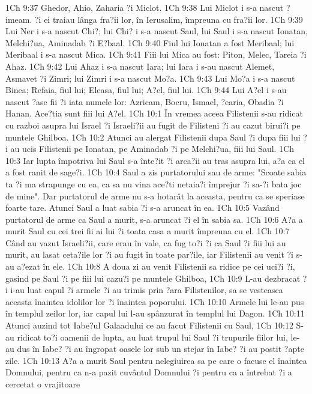 1Ch 9:37  Ghedor, Ahio, Zaharia ?i Miclot.
1Ch 9:38  Lui Miclot i s-a nascut ?imeam. ?i ei traiau lânga fra?ii lor, în Ierusalim, împreuna cu fra?ii lor.
1Ch 9:39  Lui Ner i s-a nascut Chi?; lui Chi? i s-a nascut Saul, lui Saul i s-a nascut Ionatan, Melchi?ua, Aminadab ?i E?baal.
1Ch 9:40  Fiul lui Ionatan a fost Meribaal; lui Meribaal i s-a nascut Mica.
1Ch 9:41  Fiii lui Mica au fost: Piton, Melec, Tareia ?i Ahaz.
1Ch 9:42  Lui Ahaz i s-a nascut Iara; lui Iara i s-au nascut Alemet, Asmavet ?i Zimri; lui Zimri i s-a nascut Mo?a.
1Ch 9:43  Lui Mo?a i s-a nascut Binea; Refaia, fiul lui; Eleasa, fiul lui; A?el, fiul lui.
1Ch 9:44  Lui A?el i s-au nascut ?ase fii ?i iata numele lor: Azricam, Bocru, Ismael, ?earia, Obadia ?i Hanan. Ace?tia sunt fiii lui A?el.
1Ch 10:1  În vremea aceea Filistenii s-au ridicat cu razboi asupra lui Israel ?i Israeli?ii au fugit de Filisteni ?i au cazut birui?i pe muntele Ghilboa.
1Ch 10:2  Atunci au alergat Filistenii dupa Saul ?i dupa fiii lui ?i au ucis Filistenii pe Ionatan, pe Aminadab ?i pe Melchi?ua, fiii lui Saul.
1Ch 10:3  Iar lupta împotriva lui Saul s-a înte?it ?i arca?ii au tras asupra lui, a?a ca el a fost ranit de sage?i.
1Ch 10:4  Saul a zis purtatorului sau de arme: "Scoate sabia ta ?i ma strapunge cu ea, ca sa nu vina ace?ti netaia?i împrejur ?i sa-?i bata joc de mine". Dar purtatorul de arme nu s-a hotarât la aceasta, pentru ca se speriase foarte tare. Atunci Saul a luat sabia ?i s-a aruncat în ea.
1Ch 10:5  Vazând purtatorul de arme ca Saul a murit, s-a aruncat ?i el în sabia sa.
1Ch 10:6  A?a a murit Saul cu cei trei fii ai lui ?i toata casa a murit împreuna cu el.
1Ch 10:7  Când au vazut Israeli?ii, care erau în vale, ca fug to?i ?i ca Saul ?i fiii lui au murit, au lasat ceta?ile lor ?i au fugit în toate par?ile, iar Filistenii au venit ?i s-au a?ezat în ele.
1Ch 10:8  A doua zi au venit Filistenii sa ridice pe cei uci?i ?i, gasind pe Saul ?i pe fiii lui cazu?i pe muntele Ghilboa,
1Ch 10:9  L-au dezbracat ?i i-au luat capul ?i armele ?i au trimis prin ?ara Filistenilor, sa se vesteasca aceasta înaintea idolilor lor ?i înaintea poporului.
1Ch 10:10  Armele lui le-au pus în templul zeilor lor, iar capul lui l-au spânzurat în templul lui Dagon.
1Ch 10:11  Atunci auzind tot Iabe?ul Galaadului ce au facut Filistenii cu Saul,
1Ch 10:12  S-au ridicat to?i oamenii de lupta, au luat trupul lui Saul ?i trupurile fiilor lui, le-au dus în Iabe? ?i au îngropat oasele lor sub un stejar în Iabe? ?i au postit ?apte zile.
1Ch 10:13  A?a a murit Saul pentru nelegiuirea sa pe care o facuse el înaintea Domnului, pentru ca n-a pazit cuvântul Domnului ?i pentru ca a întrebat ?i a cercetat o vrajitoare
